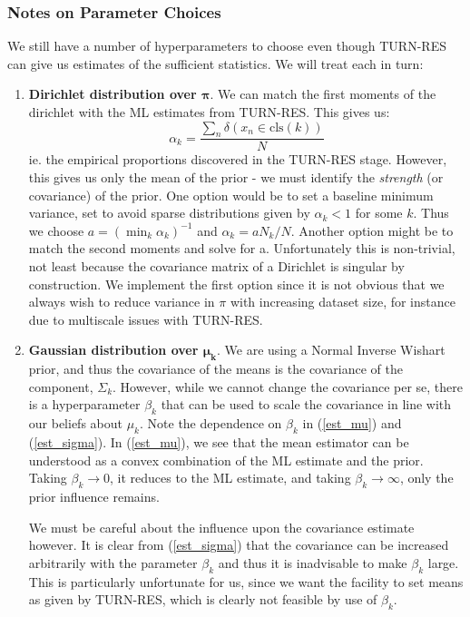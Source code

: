 \documentclass[11pt]{article}
\def\bs{\boldsymbol}
\begin{document}
\subsubsection{Notes on Parameter Choices}
We still have a number of hyperparameters to choose even though TURN-RES can give us estimates of the sufficient statistics. We will treat each in turn:\\
\begin{enumerate}
\item \textbf{Dirichlet distribution over $\bs\pi$}. We can match the first moments of the dirichlet with the ML estimates from TURN-RES. This gives us:
$$ \alpha_k = \frac{\sum_n \delta\left(x_n \in \text{cls}(k)\right)} {N}$$
ie. the empirical proportions discovered in the TURN-RES stage. However, this gives us only the mean of the prior - we must identify the \emph{strength} (or covariance) of the prior. One option would be to set a baseline minimum variance, set to avoid  sparse distributions given by $\alpha_k < 1$ for some $k$. Thus we choose $a = (\min_k \alpha_k)^{-1}$ and $\alpha_k = aN_k/N$. Another option might be to match the second moments and solve for a. Unfortunately this is non-trivial, not least because the covariance matrix of a Dirichlet is singular by construction. We implement the first option since it is not obvious that we always wish to reduce variance in $\pi$ with increasing dataset size, for instance due to multiscale issues with TURN-RES.
\item \textbf{Gaussian distribution over $\bs{\mu_k}$}. We are using a Normal Inverse Wishart prior, and thus the covariance of the means is the covariance of the component, $\Sigma_k$. However, while we cannot change the covariance per se, there is a hyperparameter $\beta_k$ that can be used to scale the covariance in line with our beliefs about $\mu_k$. Note the dependence on $\beta_k$ in (\ref{est_mu}) and (\ref{est_sigma}). In (\ref{est_mu}), we see that the mean estimator can be understood as a convex combination of the ML estimate and the prior. Taking $\beta_k \rightarrow 0$, it reduces to the ML estimate, and taking $\beta_k \rightarrow \infty$, only the prior influence remains. \par
We must be careful about the influence upon the covariance estimate however. It is clear from (\ref{est_sigma}) that the covariance can be increased arbitrarily with the parameter $\beta_k$ and thus it is inadvisable to make $\beta_k$ large. This is particularly unfortunate for us, since we want the facility to set means as given by TURN-RES, which is clearly not feasible by use of $\beta_k$.

\end{enumerate}
\end{document}
